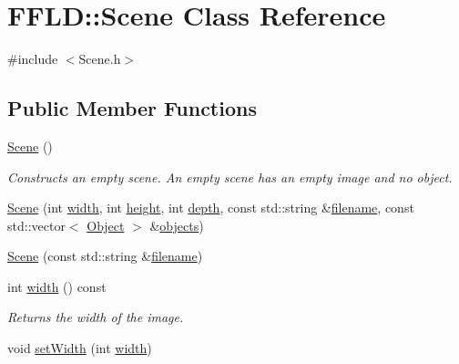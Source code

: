 \hypertarget{class_f_f_l_d_1_1_scene}{\section{F\-F\-L\-D\-:\-:Scene Class Reference}
\label{class_f_f_l_d_1_1_scene}
}


{\ttfamily \#include $<$Scene.\-h$>$}

\subsection*{Public Member Functions}
\begin{DoxyCompactItemize}
\item 
\hypertarget{class_f_f_l_d_1_1_scene_a8a5612a847dfe686a73c5db510ca4379}{\hyperlink{class_f_f_l_d_1_1_scene_a8a5612a847dfe686a73c5db510ca4379}{Scene} ()}\label{class_f_f_l_d_1_1_scene_a8a5612a847dfe686a73c5db510ca4379}

\begin{DoxyCompactList}\small\item\em Constructs an empty scene. An empty scene has an empty image and no object. \end{DoxyCompactList}\item 
\hyperlink{class_f_f_l_d_1_1_scene_aa8412a01f55891a0446de2fe4a444270}{Scene} (int \hyperlink{class_f_f_l_d_1_1_scene_a026006ae2e34895d2dc63cd2b2ca662c}{width}, int \hyperlink{class_f_f_l_d_1_1_scene_a3111f1cc57c61e7ddef8d323cc7a39e1}{height}, int \hyperlink{class_f_f_l_d_1_1_scene_ae4a337a10ad66d6a3aefd17f56db25f0}{depth}, const std\-::string \&\hyperlink{class_f_f_l_d_1_1_scene_ababad2108f7abba4268b22c27e083bfc}{filename}, const std\-::vector$<$ \hyperlink{class_f_f_l_d_1_1_object}{Object} $>$ \&\hyperlink{class_f_f_l_d_1_1_scene_a86fc9dd7daab4c755fcabf5babba1992}{objects})
\item 
\hyperlink{class_f_f_l_d_1_1_scene_a388161f65d9025c205bc36dd729dbbac}{Scene} (const std\-::string \&\hyperlink{class_f_f_l_d_1_1_scene_ababad2108f7abba4268b22c27e083bfc}{filename})
\item 
\hypertarget{class_f_f_l_d_1_1_scene_a026006ae2e34895d2dc63cd2b2ca662c}{int \hyperlink{class_f_f_l_d_1_1_scene_a026006ae2e34895d2dc63cd2b2ca662c}{width} () const }\label{class_f_f_l_d_1_1_scene_a026006ae2e34895d2dc63cd2b2ca662c}

\begin{DoxyCompactList}\small\item\em Returns the width of the image. \end{DoxyCompactList}\item 
\hypertarget{class_f_f_l_d_1_1_scene_afcb153e1e7e60dc6275093b0e7299100}{void \hyperlink{class_f_f_l_d_1_1_scene_afcb153e1e7e60dc6275093b0e7299100}{set\-Width} (int \hyperlink{class_f_f_l_d_1_1_scene_a026006ae2e34895d2dc63cd2b2ca662c}{width})}\label{class_f_f_l_d_1_1_scene_afcb153e1e7e60dc6275093b0e7299100}


\end{DoxyCompactItemize}
